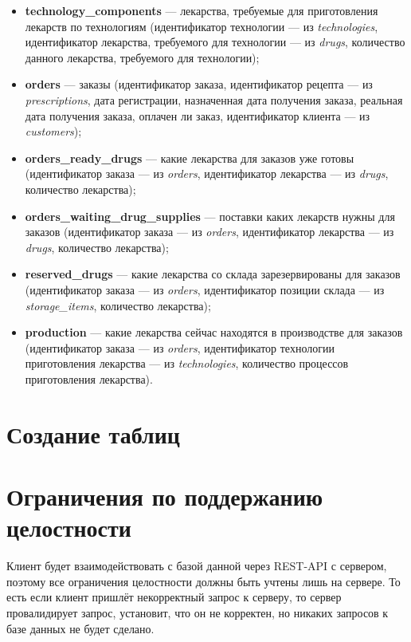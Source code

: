 \documentclass[a4paper]{article}
\newcommand{\dbtable}[1]{\textbf{#1}}
\newcommand{\dbtableref}[1]{\textit{#1}}
\begin{document}
\begin{itemize}
				\item \dbtable{technology\_components} --- лекарства, требуемые для приготовления лекарств по технологиям (идентификатор технологии --- из \dbtableref{technologies}, идентификатор лекарства, требуемого для технологии --- из \dbtableref{drugs}, количество данного лекарства, требуемого для технологии);
				
				\item \dbtable{orders} --- заказы (идентификатор заказа, идентификатор рецепта --- из \dbtableref{prescriptions}, дата регистрации, назначенная дата получения заказа, реальная дата получения заказа, оплачен ли заказ, идентификатор клиента --- из \dbtableref{customers});
				
				\item \dbtable{orders\_ready\_drugs} --- какие лекарства для заказов уже готовы (идентификатор заказа --- из \dbtableref{orders}, идентификатор лекарства --- из \dbtableref{drugs}, количество лекарства);
				
				\item \dbtable{orders\_waiting\_drug\_supplies} --- поставки каких лекарств нужны для заказов (идентификатор заказа --- из \dbtableref{orders}, идентификатор лекарства --- из \dbtableref{drugs}, количество лекарства);
				
				\item \dbtable{reserved\_drugs} --- какие лекарства со склада зарезервированы для заказов (идентификатор заказа --- из \dbtableref{orders}, идентификатор позиции склада --- из \dbtableref{storage\_items}, количество лекарства);
				
				\item \dbtable{production} --- какие лекарства сейчас находятся в производстве для заказов (идентификатор заказа --- из \dbtableref{orders}, идентификатор технологии приготовления лекарства --- из \dbtableref{technologies}, количество процессов приготовления лекарства).
			\end{itemize}	
	\newpage
	\section{Создание таблиц}
		
	\newpage
	\section{Ограничения по поддержанию целостности}
		Клиент будет взаимодействовать с базой данной через REST-API с сервером, поэтому все ограничения целостности должны быть учтены лишь на сервере. То есть если клиент пришлёт некорректный запрос к серверу, то сервер провалидирует запрос, установит, что он не корректен, но никаких запросов к базе данных не будет сделано.
\end{document}
